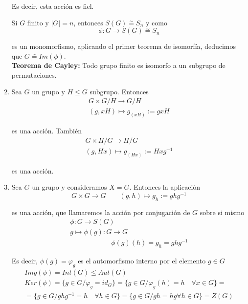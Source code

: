 \documentclass{article}
\begin{document}
\begin{enumerate}[1)]
Es decir, esta acción es fiel.

Si $G$ finito y $|G|=n$, entonces $S(G)\overset{\sim}{=} S_n$ y como
\begin{equation*}
\phi:G\longrightarrow S(G)\overset{\sim}{=} S_n
\end{equation*}

es un monomorfismo, aplicando el primer teorema de isomorfía, deducimos que $G\overset{\sim}{=} Im(\phi)$. \\

\textbf{Teorema de Cayley:} Todo grupo finito es isomorfo a un subgrupo de permutaciones.

\item Sea $G$ un grupo y $H\leq G$ subgrupo. Entonces
\begin{gather*}
G\times G/H\longrightarrow G/H\\
(g,xH)\longmapsto g_{(xH)}:=gxH
\end{gather*}

es una acción. También
\begin{gather*}
G\times H/G\longrightarrow H/G\\
(g,Hx)\longmapsto g_{(Hx)}:=Hxg^{-1}
\end{gather*}

es una acción.

\item Sea $G$ un grupo y consideramos $X=G$. Entonces la aplicación
\begin{equation*}
G\times G\longrightarrow G\qquad (g,h)\longmapsto g_h:=ghg^{-1}
\end{equation*}

es una acción, que llamaremos la acción por conjugación de $G$ sobre si mismo
\begin{gather*}
\phi:G\longrightarrow S(G)\\
g\longmapsto \phi(g):G\longrightarrow G\\
\qquad\qquad\qquad\phi(g)(h)=g_h=ghg^{-1}
\end{gather*}

Es decir, $\phi(g)=\varphi_g$ es el automorfismo interno por el elemento $g\in G$ 
\begin{gather*}
Img(\phi)=Int(G)\leq Aut(G) \\
Ker(\phi)=\{g\in G/\varphi_g=id_G\}=\{g\in G/\varphi_g(h)=h\quad \forall x\in G\}=\\
=\{g\in G/ghg^{-1}=h\quad \forall h\in G\}=\{g\in G/gh=hg\forall h\in G\}=Z(G)
\end{gather*}


\end{enumerate}
\end{document}
